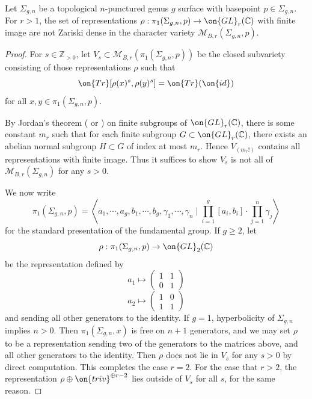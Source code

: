 \begin{lemma}
\notready
	\label{lemma:finite-image-not-dense}
	Let $\Sigma_{g,n}$ be a topological $n$-punctured genus $g$ surface with
	basepoint $p \in \Sigma_{g,n}$. For $r > 1$, the set of representations $\rho: \pi_1(\Sigma_{g,n},p) \to
	\on{GL}_r(\mathbb C)$ with finite image are not Zariski dense in the character
	variety $\mathscr{M}_{B,r}(\Sigma_{g,n}, p)$.
\end{lemma}
\begin{proof}

 For $s\in \mathbb{Z}_{>0}$, let $V_s\subset
 \mathscr{M}_{B,r}(\pi_1(\Sigma_{g,n},p))$ be the closed subvariety
	 consisting of those representations $\rho$ such that $$\on{Tr} [\rho(x)^s,
	 \rho(y)^s]=\on{Tr}(\on{id})$$ for all $x,y\in \pi_1(\Sigma_{g,n},p)$.

By Jordan's theorem (\cite[p.~91]{jordan1878memoire} or \cite[Theorem
36.13]{curtis1966representation}) on finite subgroups of $\on{GL}_r(\mathbb{C})$,
there is some constant $m_r$ such that for each finite subgroup $G\subset
\on{GL}_r(\mathbb{C})$, there exists an abelian normal subgroup $H\subset G$ of index
at most $m_r$. Hence $V_{(m_r!)}$ contains all representations with finite
image. Thus it suffices to show $V_s$ is not all of
$\mathscr{M}_{B,r}(\Sigma_{g,n})$ for any $s>0$.

We now write $$\pi_1(\Sigma_{g,n},p)=\left\langle a_1, \cdots, a_g, b_1,\cdots,
b_g, \gamma_1, \cdots, \gamma_n \mid \prod_{i=1}^g [a_i,b_i]\cdot \prod_{j=1}^n
\gamma_j\right\rangle$$ for the standard presentation of the fundamental group.
If $g\geq 2$, let $$\rho: \pi_1(\Sigma_{g,n},p)\to \on{GL}_2(\mathbb{C})$$ be the representation defined by $$a_1 \mapsto \begin{pmatrix} 1 & 1 \\ 0 & 1 \end{pmatrix}$$
$$a_2 \mapsto \begin{pmatrix} 1 & 0 \\ 1 & 1 \end{pmatrix}$$
and sending all other generators to the identity.  If $g=1$, hyperbolicity of
$\Sigma_{g,n}$ implies $n>0$. Then $\pi_1(\Sigma_{g,n},x)$ is free on $n+1$ generators, and we may set $\rho$ to be a representation sending two of the generators to the matrices above, and all other generators to the identity.
Then $\rho$ does not lie in $V_s$ for any $s>0$ by direct computation. This completes the case $r = 2$. For the case that $r > 2$, the representation $\rho\oplus \on{triv}^{\oplus r-2}$ lies outside of $V_s$ for all $s$, for the same reason.
\end{proof}

